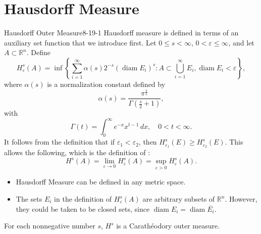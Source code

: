 \documentclass[../main.tex]{subfiles}
\begin{document}
\section{Hausdorff Measure}
\begin{definition}{Hausdorff Outer Measure}{8-19-1}
Hausdorff measure is defined in terms of an auxiliary set function that we introduce first. Let $0 \le s < \infty$, $0 < \varepsilon \le \infty$, and let $A \subset \mathbb{R}^n$. Define
\[
H_{\varepsilon}^{s}(A) = \inf \left\{ \sum_{i=1}^{\infty} \alpha(s) 2^{-s} (\operatorname{diam} E_i)^s : A \subset \bigcup_{i=1}^{\infty} E_i, \operatorname{diam} E_i < \varepsilon \right\},
\]
where $\alpha(s)$ is a normalization constant defined by
\[
\alpha(s) = \frac{\pi^{\frac{s}{2}}}{\Gamma(\frac{s}{2}+1)},
\]
with
\[
\Gamma(t) = \int_{0}^{\infty} e^{-x} x^{t-1} \,dx, \quad 0 < t < \infty.
\]It follows from the definition that if $\varepsilon_1 < \varepsilon_2$, then $H_{\varepsilon_1}^s(E) \ge H_{\varepsilon_2}^s(E)$. This allows the following, which is the definition of :
\[
H^s(A) = \lim_{\varepsilon \to 0} H_{\varepsilon}^s(A) = \sup_{\varepsilon > 0} H_{\varepsilon}^s(A).
\]

\end{definition}

\begin{remark}
    \begin{itemize}
        \item Hausdorff Measure can be defined in any metric space.
        \item The sets \(  E_{i}  \) in the definition of \(  H_{ \varepsilon }^{s}\left( A \right)   \) are arbitrary subsets of \(  \mathbb{R} ^{n}  \). However, they could be taken to be closed sets, since \(  \operatorname{diam}E_{i}= \operatorname{diam} \overline{E_{i}}  \).     
    \end{itemize}
    
\end{remark}


\begin{theorem}{}{}
    For each nonnegative number \(  s  \), \(  H^{s}  \) is a Carathéodory outer measure.  
\end{theorem}
\end{document}
